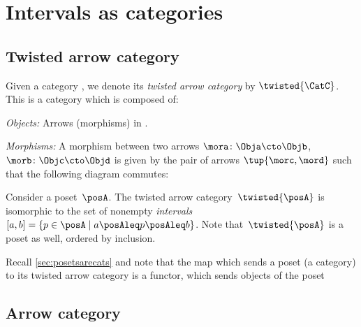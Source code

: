 \section{Intervals as categories}
\subsection{Twisted arrow category}
\begin{ctdefinition}
  \label{def:twisted-arrow}
  Given a category \CatC, we denote its \emph{twisted arrow category} by $\twisted{\CatC}$. This is a category which is composed of:
  \begin{compactenum}
    \item \emph{Objects:} Arrows (morphisms) in \CatC.
    \item \emph{Morphisms:} A morphism between two arrows $\mora\colon \Obja \cto \Objb $, $\morb\colon \Objc \cto \Objd$ is given by the pair of arrows $\tup{\morc,\mord}$ such that the following diagram commutes:
    \begin{center}
    \end{center}
  \end{compactenum}
\end{ctdefinition}



\begin{example}[Intervals]
  Consider a poset~$\posA$. The twisted arrow category~$\twisted{\posA}$ is isomorphic to the set of nonempty \emph{intervals}~$[a,b]=\{p \in \posA \mid a\posAleq p \posAleq b\}$. Note that~$\twisted{\posA}$ is a poset as well, ordered by inclusion.
\end{example}
\begin{remark}
  Recall \cref{sec:posetsarecats} and note that the map which sends a poset (a category) to its twisted arrow category is a functor, which sends objects of the poset
\end{remark}

\subsection{Arrow category}

